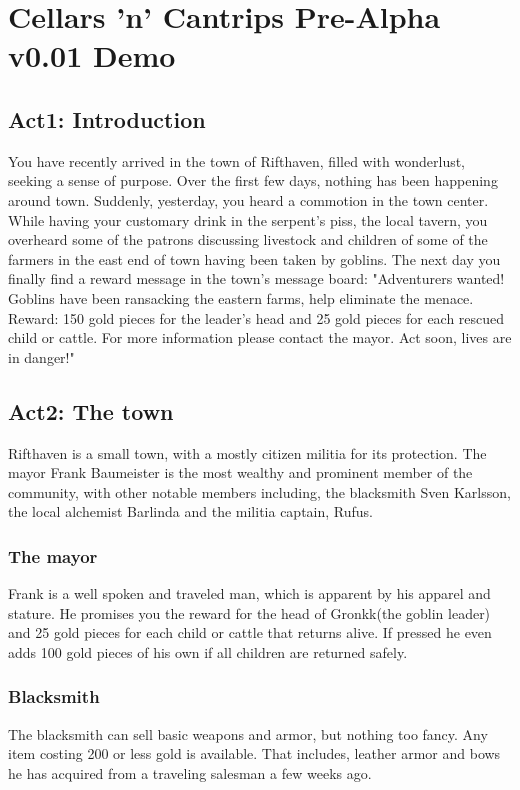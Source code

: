\documentclass[11pt]{article}
\author{Charilaos Skandylas}
\date{\today}
\title{}
\begin{document}
\section*{Cellars 'n' Cantrips Pre-Alpha v0.01 Demo}
\label{sec:org8c72f58}
\subsection*{Act1: Introduction}
\label{sec:org12f5643}
You have recently arrived in the town of Rifthaven, filled with wonderlust, seeking a sense of purpose.
Over the first few days, nothing has been happening around town. Suddenly, yesterday, you heard a commotion
in the town center. While having your customary drink in the serpent's piss, the local tavern, you overheard some 
of the patrons discussing livestock and children of some of the farmers in the east end of town having been taken
by goblins. The next day you finally find a reward message in the town's message board: "Adventurers wanted!
Goblins have been ransacking the eastern farms, help eliminate the menace. Reward: 150 gold pieces for the
leader's head and 25 gold pieces for each rescued child or cattle. For more information please contact the mayor.
Act soon, lives are in danger!"  

\subsection*{Act2: The town}
\label{sec:org051c4f5}
Rifthaven is a small town, with a mostly citizen militia for its protection. 
The mayor Frank Baumeister is the most wealthy and prominent member of the community, 
with other notable members including, the blacksmith Sven Karlsson, the local alchemist Barlinda
and the  militia captain, Rufus.
\subsubsection*{The mayor}
\label{sec:org87ad70a}
Frank is a well spoken and traveled man, which is apparent by his apparel and stature.
He promises you the reward for the head of Gronkk(the goblin leader) and 25 gold pieces for each child or 
cattle that returns alive. If pressed he even adds 100 gold pieces of his own if all children are returned
safely.

\subsubsection*{Blacksmith}
\label{sec:org46db823}
The blacksmith can sell basic weapons and armor, but nothing too fancy.
Any item costing 200 or less gold is available. 
That includes, leather armor and bows he has acquired from a traveling salesman a few weeks ago.
\end{document}

